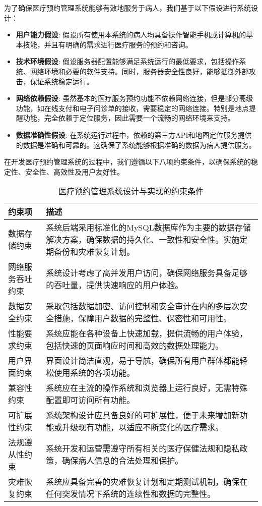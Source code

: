 为了确保医疗预约管理系统能够有效地服务于病人，我们基于以下假设进行系统设计：

\begin{itemize}
	\item \textbf{用户能力假设}: 假设所有使用本系统的病人均具备操作智能手机或计算机的基本技能，并且有明确的需求进行医疗服务的预约和咨询。
	\item \textbf{技术环境假设}: 假设服务器配置能够满足系统运行的最低要求，包括操作系统、网络环境和必要的软件支持。同时，服务器安全性良好，能够抵御外部攻击，保证系统稳定运行。
	\item \textbf{网络依赖假设}: 虽然基本的医疗服务预约功能不依赖网络连接，但是部分高级功能，如在线支付和电子问诊单的接收，需要稳定的网络连接。特别是地点提醒功能，完全依赖于定位服务，因此需要一个流畅的网络环境来支持。
	\item \textbf{数据准确性假设}: 在系统运行过程中，依赖的第三方API和地图定位服务提供的数据是准确和可靠的。这确保了系统能够根据准确的数据为病人提供服务。
\end{itemize}

在开发医疗预约管理系统的过程中，我们遵循以下八项约束条件，以确保系统的稳定性、安全性、高效性及用户友好性。

\begin{table}[htbp]
	\centering
	\begin{tabular}{|l|p{10cm}|}
		\hline
		\textbf{约束项} & \textbf{描述} \\
		\hline
		数据存储约束 & 系统后端采用标准化的MySQL数据库作为主要的数据存储解决方案，确保数据的持久化、一致性和安全性。实施定期备份和灾难恢复计划。 \\
		网络服务吞吐约束 & 系统设计考虑了高并发用户访问，确保网络服务具备足够的吞吐量，提供快速响应的用户体验。 \\
		数据安全约束 & 采取包括数据加密、访问控制和安全审计在内的多层次安全措施，保障用户数据的完整性、保密性和可用性。 \\
		性能要求约束 & 系统应能在各种设备上快速加载，提供流畅的用户体验，包括快速的页面响应时间和高效的数据处理能力。 \\
		用户界面约束 & 界面设计简洁直观，易于导航，确保所有用户群体都能轻松使用系统的各项功能。 \\
		兼容性约束 & 系统应在主流的操作系统和浏览器上运行良好，无需特殊配置即可访问所有功能。 \\
		可扩展性约束 & 系统架构设计应具备良好的可扩展性，便于未来增加新功能或升级现有功能，以适应不断变化的医疗需求。 \\
		法规遵从性约束 & 系统开发和运营需遵守所有相关的医疗保健法规和隐私政策，确保病人信息的合法处理和保护。 \\
		灾难恢复约束 & 系统应具备完善的灾难恢复计划和定期测试机制，确保在任何突发情况下系统的连续性和数据的完整性。 \\
		\hline
	\end{tabular}
	\caption{医疗预约管理系统设计与实现的约束条件}
\end{table}

